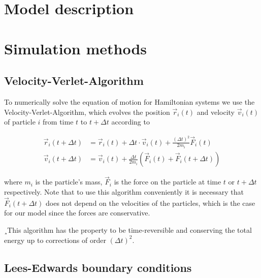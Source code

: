 \documentclass[DIV=9,11pt,BCOR=5mm,twoside=semi,abstract]{scrreprt}
\begin{document}

	\chapter{Model description}
	\label{chap:model_description}


	\chapter{Simulation methods}
	\label{chap:simulation_methods}
	
	\section{Velocity-Verlet-Algorithm}
	\label{sec:velocity_verlet_algorithm}
	
	To numerically solve the equation of motion for Hamiltonian systems we use the Velocity-Verlet-Algorithm, which evolves the position $\vec{r}_i(t)$ and velocity $\vec{v}_i(t)$ of particle $i$ from time $t$ to $t+\Delta t$ according to
	
	\begin{align}
		\vec{r}_i (t+\Delta t) &= \vec{r}_i (t) + \Delta t \cdot \vec{v}_i (t) + \frac{({\Delta t})^2}{2m_i}  \vec{F}_i(t) \\
		\vec{v}_i (t+\Delta t) &= \vec{v}_i (t) + \frac{\Delta t}{2 m_i} \left( \vec{F}_i(t) + \vec{F}_i (t+ \Delta t) \right)
	\end{align}
	
	where $m_i$ is the particle's mass, $\vec{F}_i$ is the force on the particle at time $t$ or $t + \Delta t$ respectively. Note that to use this algorithm conveniently it is necessary that $\vec{F}_i (t + \Delta t)$ does not depend on the velocities of the particles, which is the case for our model since the forces are conservative. \par 
	¸This algorithm has the property to be time-reversible and conserving the total energy up to corrections of order $(\Delta t)^2$.
	
	\section{Lees-Edwards boundary conditions}
	\label{sec:lees_edwards_boundary_conditions}
	
\end{document}
